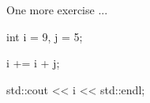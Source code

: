 One more exercise ...

\begin{console}

int i = 9, j = 5;



i += i + j;

std::cout << i << std::endl;

\end{console}

